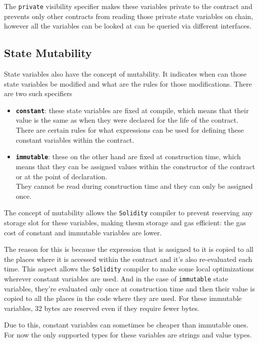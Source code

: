 The \texttt{private} visibility specifier makes these variables private
to the contract and prevents only other contracts from reading those
private state variables on chain, however all the variables can be
looked at can be queried via different interfaces.

\subsection{State Mutability}\label{state-mutability}

State variables also have the concept of mutability. It indicates when
can those state variables be modified and what are the rules for those
modifications. There are two such specifiers

\begin{itemize}
\item
  \textbf{\texttt{constant}}: these state variables are fixed at
  compile, which means that their value is the same as when they were
  declared for the life of the contract.\\

  There are certain rules for what expressions can be used for defining
  these constant variables within the contract.
\item
  \textbf{\texttt{immutable}}: these on the other hand are fixed at
  construction time, which means that they can be assigned values within
  the constructor of the contract or at the point of declaration.\\

  They cannot be read during construction time and they can only be
  assigned once.
\end{itemize}

The concept of mutability allows the \texttt{Solidity} compiler to
prevent reserving any storage slot for these variables, making thesm
storage and gas efficient: the gas cost of constant and immutable
variables are lower.

The reason for this is because the expression that is assigned to it is
copied to all the places where it is accessed within the contract and
it's also re-evaluated each time. This aspect allows the
\texttt{Solidity} compiler to make some local optimizations wherever
constant variables are used. And in the case of \texttt{immutable} state
variables, they're evaluated only once at construction time and then
their value is copied to all the places in the code where they are used.
For these immutable variables, 32 bytes are reserved even if they
require fewer bytes.

Due to this, constant variables can sometimes be cheaper than immutable
ones. For now the only supported types for these variables are strings
and value types.
